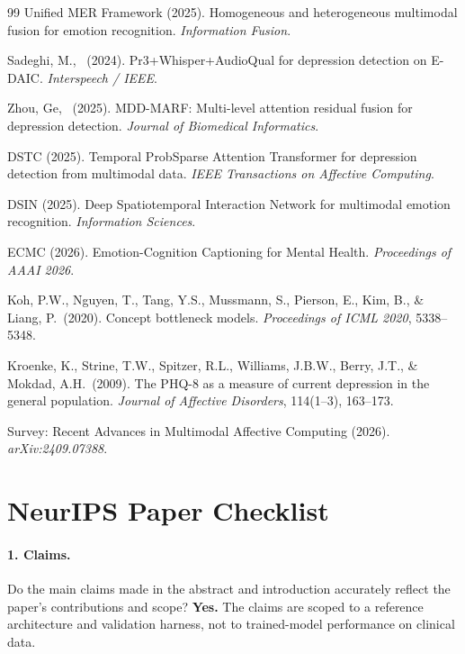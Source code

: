 \documentclass{article}
\begin{document}
{\begin{thebibliography}{99}
  Unified MER Framework (2025).
  Homogeneous and heterogeneous multimodal fusion for emotion recognition.
  \textit{Information Fusion}.

  Sadeghi, M., \etal\ (2024).
  Pr3+Whisper+AudioQual for depression detection on E-DAIC.
  \textit{Interspeech / IEEE}.

  Zhou, Ge, \etal\ (2025).
  MDD-MARF: Multi-level attention residual fusion for depression detection.
  \textit{Journal of Biomedical Informatics}.

  DSTC (2025).
  Temporal ProbSparse Attention Transformer for depression detection from multimodal data.
  \textit{IEEE Transactions on Affective Computing}.

  DSIN (2025).
  Deep Spatiotemporal Interaction Network for multimodal emotion recognition.
  \textit{Information Sciences}.

  ECMC (2026).
  Emotion-Cognition Captioning for Mental Health.
  \textit{Proceedings of AAAI 2026}.

  Koh, P.W., Nguyen, T., Tang, Y.S., Mussmann, S., Pierson, E., Kim, B., \&
  Liang, P.\ (2020).
  Concept bottleneck models.
  \textit{Proceedings of ICML 2020}, 5338--5348.

  Kroenke, K., Strine, T.W., Spitzer, R.L., Williams, J.B.W., Berry, J.T., \&
  Mokdad, A.H.\ (2009).
  The PHQ-8 as a measure of current depression in the general population.
  \textit{Journal of Affective Disorders}, 114(1--3), 163--173.

  Survey: Recent Advances in Multimodal Affective Computing (2026).
  \textit{arXiv:2409.07388}.

\end{thebibliography}
}


\newpage
\section*{NeurIPS Paper Checklist}

\paragraph{1. Claims.}
Do the main claims made in the abstract and introduction accurately reflect the paper's
contributions and scope?
\textbf{Yes.}
The claims are scoped to a reference architecture and validation harness, not to
trained-model performance on clinical data.
\end{document}
